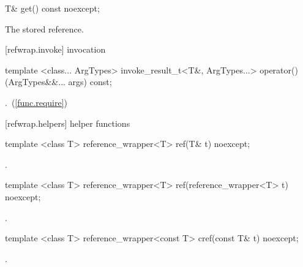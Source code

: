 %
\begin{itemdecl}
T& get() const noexcept;
\end{itemdecl}

\begin{itemdescr}
\pnum\returns The stored reference.
\end{itemdescr}


[refwrap.invoke]{ invocation}

%
\begin{itemdecl}
template <class... ArgTypes>
  invoke_result_t<T&, ArgTypes...>
    operator()(ArgTypes&&... args) const;
\end{itemdecl}

\begin{itemdescr}
\pnum\returns {}.~(\ref{func.require})
\end{itemdescr}


[refwrap.helpers]{ helper functions}

%
\begin{itemdecl}
template <class T> reference_wrapper<T> ref(T& t) noexcept;
\end{itemdecl}

\begin{itemdescr}
\pnum\returns {}.
\end{itemdescr}

%
\begin{itemdecl}
template <class T> reference_wrapper<T> ref(reference_wrapper<T> t) noexcept;
\end{itemdecl}

\begin{itemdescr}
\pnum\returns {}.
\end{itemdescr}

%
\begin{itemdecl}
template <class T> reference_wrapper<const T> cref(const T& t) noexcept;
\end{itemdecl}

\begin{itemdescr}
\pnum\returns {}.
\end{itemdescr}

